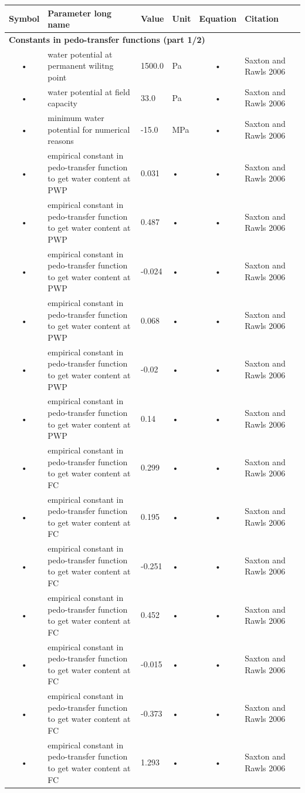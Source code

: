 \documentclass[11pt,oneside,openright,a4paper,fleqn]{book}  %
\begin{document}
\begin{table}
\begin{tabularx}{\linewidth}{|c|X|l|l|c|l|c|} %
\hline 
Symbol & Parameter long name & Value & Unit & Equation & Citation \\
\hline 

\multicolumn{6}{l}{\bf Constants in pedo-transfer functions (part 1/2)}\\
\hline
• & water potential at permanent wilitng point & 1500.0 & Pa & • & Saxton and Rawls 2006 \\
• & water potential at field capacity & 33.0 & Pa & • & Saxton and Rawls 2006 \\
• & minimum water potential for numerical reasons & -15.0 & MPa & • & Saxton and Rawls 2006 \\
• & empirical constant in pedo-transfer function to get water content at PWP & 0.031 & • & • & Saxton and Rawls 2006 \\
• & empirical constant in pedo-transfer function to get water content at PWP & 0.487 & • & • & Saxton and Rawls 2006 \\
• & empirical constant in pedo-transfer function to get water content at PWP & -0.024 & • & • & Saxton and Rawls 2006 \\
• & empirical constant in pedo-transfer function to get water content at PWP & 0.068 & • & • & Saxton and Rawls 2006 \\
• & empirical constant in pedo-transfer function to get water content at PWP & -0.02 & • & • & Saxton and Rawls 2006 \\
• & empirical constant in pedo-transfer function to get water content at PWP & 0.14 & • & • & Saxton and Rawls 2006 \\
• & empirical constant in pedo-transfer function to get water content at FC & 0.299 & • & • & Saxton and Rawls 2006 \\
• & empirical constant in pedo-transfer function to get water content at FC & 0.195 & • & • & Saxton and Rawls 2006 \\
• & empirical constant in pedo-transfer function to get water content at FC & -0.251 & • & • & Saxton and Rawls 2006 \\
• & empirical constant in pedo-transfer function to get water content at FC & 0.452 & • & • & Saxton and Rawls 2006 \\
• & empirical constant in pedo-transfer function to get water content at FC & -0.015 & • & • & Saxton and Rawls 2006 \\
• & empirical constant in pedo-transfer function to get water content at FC & -0.373 & • & • & Saxton and Rawls 2006 \\
• & empirical constant in pedo-transfer function to get water content at FC & 1.293 & • & • & Saxton and Rawls 2006 \\
\hline 
\end{tabularx}
\end{table}
\end{document}
